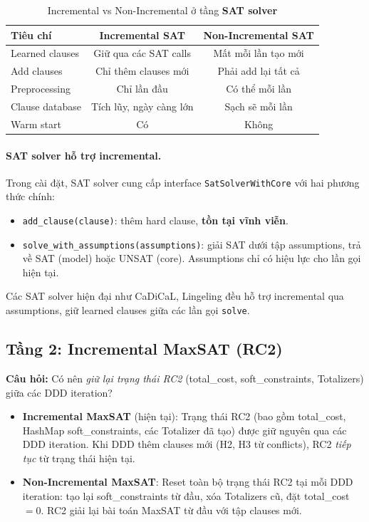 \documentclass[11pt,a4paper]{article}
\begin{document}
\begin{table}[h]
\centering
\begin{tabular}{lcc}
\toprule
\textbf{Tiêu chí} & \textbf{Incremental SAT} & \textbf{Non-Incremental SAT} \\
\midrule
Learned clauses & Giữ qua các SAT calls & Mất mỗi lần tạo mới \\
Add clauses & Chỉ thêm clauses mới & Phải add lại tất cả \\
Preprocessing & Chỉ lần đầu & Có thể mỗi lần \\
Clause database & Tích lũy, ngày càng lớn & Sạch sẽ mỗi lần \\
Warm start & Có & Không \\
\bottomrule
\end{tabular}
\caption{Incremental vs Non-Incremental ở tầng \textbf{SAT solver}}
\end{table}

\paragraph{SAT solver hỗ trợ incremental.} Trong cài đặt, SAT solver cung cấp interface \texttt{SatSolverWithCore} với hai phương thức chính:
\begin{itemize}
  \item \texttt{add\_clause(clause)}: thêm hard clause, \textbf{tồn tại vĩnh viễn}.
  \item \texttt{solve\_with\_assumptions(assumptions)}: giải SAT dưới tập assumptions, trả về SAT (model) hoặc UNSAT (core). Assumptions chỉ có hiệu lực cho lần gọi hiện tại.
\end{itemize}
Các SAT solver hiện đại như CaDiCaL, Lingeling đều hỗ trợ incremental qua assumptions, giữ learned clauses giữa các lần gọi \texttt{solve}.

\subsection{Tầng 2: Incremental MaxSAT (RC2)}
\label{sec:incr-maxsat}

\textbf{Câu hỏi:} Có nên \emph{giữ lại trạng thái RC2} (total\_cost, soft\_constraints, Totalizers) giữa các DDD iteration?

\begin{itemize}
  \item \textbf{Incremental MaxSAT} (hiện tại): Trạng thái RC2 (bao gồm total\_cost, HashMap soft\_constraints, các Totalizer đã tạo) được giữ nguyên qua các DDD iteration. Khi DDD thêm clauses mới (H2, H3 từ conflicts), RC2 \emph{tiếp tục} từ trạng thái hiện tại.

  \item \textbf{Non-Incremental MaxSAT}: Reset toàn bộ trạng thái RC2 tại mỗi DDD iteration: tạo lại soft\_constraints từ đầu, xóa Totalizers cũ, đặt total\_cost $= 0$. RC2 giải lại bài toán MaxSAT từ đầu với tập clauses mới.
\end{itemize}
\end{document}
